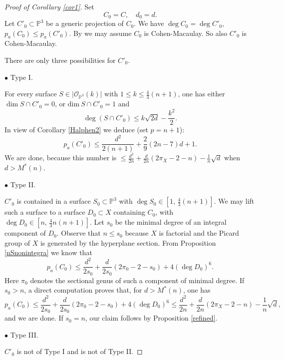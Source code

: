 \documentclass[9pt,a4paper]{amsart}
\theoremstyle{plain}
\theoremstyle{definition}
\theoremstyle{remark}
\begin{document}
\smallskip
\begin{proof}[Proof of Corollary \ref{cor1}]
Set
$$
C_0=C, \quad d_0=d.
$$
Let  $C'_0\subset \mathbb P^3$ be a generic projection  of $C_0$. We
have $\deg C_0=\deg C'_0$, $p_a(C_0)\leq p_a(C'_0)$. By \cite[Lemma
4.3 and proof]{Liu2} we may assume $C_0$ is Cohen-Macaulay. So also
$C'_0$ is Cohen-Macaulay.

\smallskip
There are only three possibilities for $C'_0$.


\smallskip
$\bullet$ Type I.

\smallskip
For every surface $S \in \vert \mathcal{O}_{\mathbb{P}^3}(k) \vert$
with $1\leq k\leq \frac{4}{3}(n+1)$, one has either $\dim S\cap
C'_0=0$, or $\mathrm{dim}\ S\cap C'_0 = 1$ and
$$
\deg(S\cap C'_0) \leq k\sqrt{2d}-\dfrac{k^2}{2}.
$$
In view of  Corollary \ref{Halphen2} we deduce (set $p=n+1$):
$$
p_a(C'_0)\leq \frac{d^2}{2(n+1)}+\frac{2}{9}(2n-7)d+1.
$$
We are done, because this number is $\leq
\frac{d^2}{2n}+\frac{d}{2n}\left(2\pi_X-2-n\right)-\frac{1}{n}\sqrt{d}$
when $d>M^*(n)$.


\smallskip
$\bullet$ Type II.

\smallskip
$C'_0$ is contained in a surface  $S_0\subset \mathbb P^3$ with
$\deg S_0\in [1,\,\frac{4}{3}(n+1)]$. We may lift such a surface to
a surface $D_0\subset X$ containing $C_0$, with $\deg D_0\in
[n,\,\frac{4}{3}n(n+1)]$. Let
$s_0$ be the minimal degree of an integral component of $D_0$.
Observe that $n\leq s_0$ because $X$ is factorial and the Picard
group of $X$ is generated by the hyperplane section. From
Proposition \ref{nSnonintegra} we know that
$$
p_a(C_0)\leq \frac{d^2}{2s_0}+\frac{d}{2s_0}(2\pi_0-2-s_0)+4(\deg
D_0)^6.
$$
Here $\pi_0$ denotes the sectional genus of such a component of
minimal degree. If $s_0>n$, a direct computation proves that, for
$d>M^*(n)$, one has
$$
p_a(C_0)\leq
\frac{d^2}{2s_0}+\frac{d}{2s_0}(2\pi_0-2-s_0)+4(\deg
D_0)^6\leq
\frac{d^2}{2n}+\frac{d}{2n}\left(2\pi_X-2-n\right)-\frac{1}{n}\sqrt{d},
$$
and we are done. If $s_0=n$, our claim follows by Proposition
\ref{refined}.


\smallskip
$\bullet$ Type III.

\smallskip
$C'_0$ is not of Type I and is not of Type II.


\end{proof}
\end{document}
